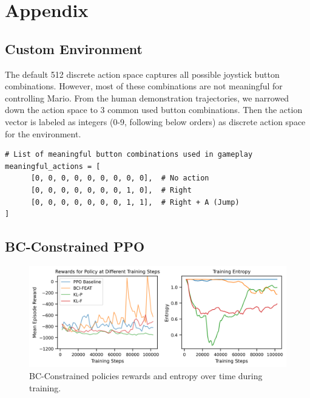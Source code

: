 \documentclass{article}
\begin{document}
\clearpage



\clearpage
\appendix
\renewcommand{\thefigure}{A\arabic{figure}}
\renewcommand{\thetable}{A\arabic{table}}
\setcounter{figure}{0}
\setcounter{table}{0}
\onecolumn

\section{Appendix}
\subsection{Custom Environment}
\label{a1:custom_env}

The default 512 discrete action space captures all possible joystick button 
combinations. However, most of these combinations are not meaningful for 
controlling Mario. From the human demonstration trajectories, we narrowed down 
the action space to 3 common used button combinations.
Then the action vector is labeled as integers (0-9, following below orders)
as discrete action space for the environment.

\begin{verbatim}
# List of meaningful button combinations used in gameplay
meaningful_actions = [
      [0, 0, 0, 0, 0, 0, 0, 0, 0],  # No action
      [0, 0, 0, 0, 0, 0, 0, 1, 0],  # Right
      [0, 0, 0, 0, 0, 0, 0, 1, 1],  # Right + A (Jump)
]
\end{verbatim}

\subsection{BC-Constrained PPO}

\begin{figure}[h]
      \centering
      \includegraphics[width=\columnwidth]{figures/bcc-training.png}
      \caption{BC-Constrained policies rewards and entropy over time during
      training.}
      \label{fig:res_bcc_deepdive}
\end{figure}
\end{document}
